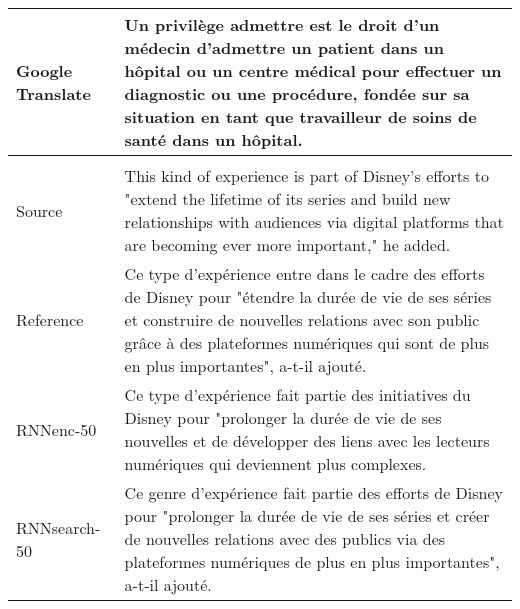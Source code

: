 \begin{table}[htp]
\begin{minipage}{0.99\textwidth}
\begin{tabular}{p{1.9cm} | p{12cm}}
\hline Google \mbox{Translate} & Un privilège admettre est le droit d'un m\'edecin
d'admettre un patient dans un h\^opital ou un centre m\'edical pour effectuer un
diagnostic ou une proc\'edure, fond\'ee sur sa situation en tant que travailleur de
soins de sant\'e dans un h\^opital.
\\
\hline
\multicolumn{2}{c}{} \\
\hline Source & 
This kind of experience is part of Disney's efforts to "extend
the lifetime of its series and build new relationships with audiences via
digital platforms that are becoming ever more important," he added.
\\
\hline Reference & Ce type d'exp\'erience entre dans le cadre des efforts de Disney pour "\'etendre la dur\'ee de vie de ses s\'eries et construire de nouvelles relations avec son public grâce à des plateformes num\'eriques qui sont de plus en plus importantes", a-t-il ajout\'e.
\\
\hline RNNenc-50 & Ce type d'exp\'erience fait partie des initiatives du Disney pour "prolonger la dur\'ee de vie de ses nouvelles et de d\'evelopper des liens avec les lecteurs num\'eriques qui deviennent plus complexes.
\\
\hline RNNsearch-50 & Ce genre d'exp\'erience fait partie des efforts de Disney pour "prolonger la dur\'ee de vie de ses s\'eries et cr\'eer de nouvelles relations avec des publics via des plateformes num\'eriques de plus en plus importantes", a-t-il ajout\'e.

\end{tabular}
\end{minipage}
\end{table}
